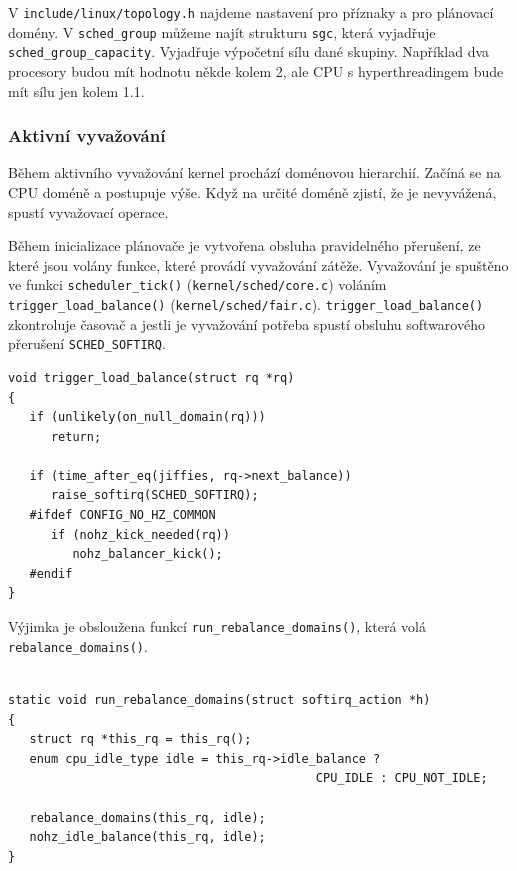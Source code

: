 \documentclass[
  field=ainfk,
  biblatex,
  glossaries,
  index
]{kidiplom}
\begin{document}
V \verb#include/linux/topology.h# najdeme nastavení pro příznaky a pro plánovací domény. V \verb#sched_group# můžeme najít strukturu \verb#sgc#, která vyjadřuje \verb#sched_group_capacity#. Vyjadřuje výpočetní sílu dané skupiny. Například dva procesory budou mít hodnotu někde kolem 2, ale CPU s hyperthreadingem bude mít sílu jen kolem 1.1. 

\subsubsection{Aktivní vyvažování}

Během aktivního vyvažování kernel prochází doménovou hierarchií. Začíná se na CPU doméně a postupuje výše. Když na určité doméně zjistí, že je nevyvážená, spustí vyvažovací operace.

Během inicializace plánovače je vytvořena obsluha pravidelného přerušení, ze které jsou volány funkce, které provádí vyvažování zátěže. Vyvažování je spuštěno ve funkci \verb#scheduler_tick()# (\verb#kernel/sched/core.c#) voláním \linebreak \verb#trigger_load_balance()# (\verb#kernel/sched/fair.c#). \verb#trigger_load_balance()# zkontroluje časovač a jestli je vyvažování potřeba spustí obsluhu softwarového přerušení \verb#SCHED_SOFTIRQ#.

\begin{verbatim} 
void trigger_load_balance(struct rq *rq)
{
   if (unlikely(on_null_domain(rq)))
      return;

   if (time_after_eq(jiffies, rq->next_balance))
      raise_softirq(SCHED_SOFTIRQ);
   #ifdef CONFIG_NO_HZ_COMMON
      if (nohz_kick_needed(rq))
         nohz_balancer_kick();
   #endif
}
\end{verbatim} 

Výjimka je obsloužena funkcí \verb#run_rebalance_domains()#, která volá \linebreak \verb#rebalance_domains()#. 

\begin{verbatim} 

static void run_rebalance_domains(struct softirq_action *h)
{
   struct rq *this_rq = this_rq();
   enum cpu_idle_type idle = this_rq->idle_balance ?
                                           CPU_IDLE : CPU_NOT_IDLE;

   rebalance_domains(this_rq, idle);
   nohz_idle_balance(this_rq, idle);
}

\end{verbatim} 
\end{document}
